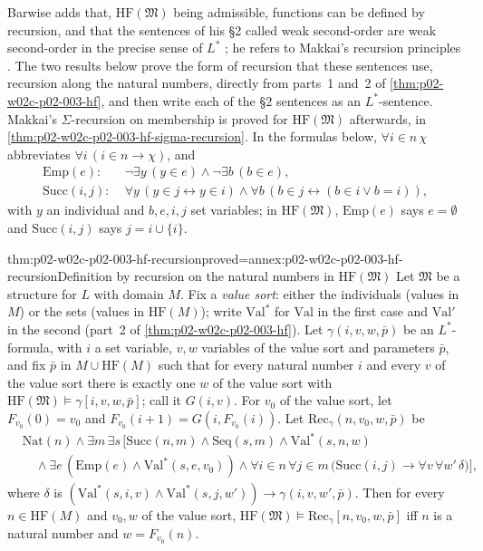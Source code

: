 Barwise adds that, \(\mathrm{HF}(\mathfrak M)\) being admissible, functions
can be defined by recursion, and that the sentences of his \S2 called weak
second-order are weak second-order in the precise sense of \(L^{*}\)
\cite[ch.~A.1, \S5, 5.3, p.~43]{Barwise1977FirstOrder}; he refers to
Makkai's recursion principles \cite[ch.~A.7, \S2, 2.16--2.17, p.~243]{Makkai1977}.
The two results below prove the form of recursion that these sentences
use, recursion along the natural numbers, directly from parts~1 and~2 of
\cref{thm:p02-w02c-p02-003-hf}, and then write each of the \S2 sentences
as an \(L^{*}\)-sentence.  Makkai's \(\Sigma\)-recursion on membership is
proved for \(\mathrm{HF}(\mathfrak M)\) afterwards, in
\cref{thm:p02-w02c-p02-003-hf-sigma-recursion}.
In the formulas below, \(\forall i\in n\,\chi\) abbreviates
\(\forall i\,(i\in n\to\chi)\), and
\begin{align*}
 \mathrm{Emp}(e)\colon\;&\neg\exists y\,(y\in e)\land\neg\exists b\,(b\in e),\\
 \mathrm{Succ}(i,j)\colon\;&\forall y\,(y\in j\leftrightarrow y\in i)\land
   \forall b\,(b\in j\leftrightarrow(b\in i\lor b=i)),
\end{align*}
with \(y\) an individual and \(b,e,i,j\) set variables; in
\(\mathrm{HF}(\mathfrak M)\), \(\mathrm{Emp}(e)\) says \(e=\emptyset\) and
\(\mathrm{Succ}(i,j)\) says \(j=i\cup\{i\}\).

\begin{hbtheorem}{thm:p02-w02c-p02-003-hf-recursion}{proved=annex:p02-w02c-p02-003-hf-recursion}{Definition by recursion on the natural numbers in \(\mathrm{HF}(\mathfrak M)\)}
Let \(\mathfrak M\) be a structure for \(L\) with domain \(M\).  Fix a
\emph{value sort}: either the individuals (values in \(M\)) or the sets
(values in \(\mathrm{HF}(M)\)); write \(\mathrm{Val}^{\ast}\) for
\(\mathrm{Val}\) in the first case and \(\mathrm{Val}'\) in the second
(part~2 of \cref{thm:p02-w02c-p02-003-hf}).  Let
\(\gamma(i,v,w,\bar p)\) be an \(L^{*}\)-formula, with \(i\) a set
variable, \(v,w\) variables of the value sort and parameters \(\bar p\),
and fix \(\bar p\) in \(M\cup\mathrm{HF}(M)\) such that for every natural
number \(i\) and every \(v\) of the value sort there is exactly one \(w\)
of the value sort with \(\mathrm{HF}(\mathfrak M)\models\gamma[i,v,w,\bar
p]\); call it \(G(i,v)\).  For \(v_0\) of the value sort, let
\(F_{v_0}(0)=v_0\) and \(F_{v_0}(i+1)=G(i,F_{v_0}(i))\).  Let
\(\mathrm{Rec}_\gamma(n,v_0,w,\bar p)\) be
\[
\begin{aligned}
&\mathrm{Nat}(n)\land\exists m\,\exists s\,\bigl[\mathrm{Succ}(n,m)\land
 \mathrm{Seq}(s,m)\land\mathrm{Val}^{\ast}(s,n,w)\\
&\quad{}\land\exists e\,(\mathrm{Emp}(e)\land\mathrm{Val}^{\ast}(s,e,v_0))
 \land\forall i\in n\,\forall j\in m\,\bigl(\mathrm{Succ}(i,j)\to
 \forall v\,\forall w'\,\delta\bigr)\bigr],
\end{aligned}
\]
where \(\delta\) is \((\mathrm{Val}^{\ast}(s,i,v)\land
\mathrm{Val}^{\ast}(s,j,w'))\to\gamma(i,v,w',\bar p)\).
Then for every \(n\in\mathrm{HF}(M)\) and \(v_0,w\) of the value sort,
\(\mathrm{HF}(\mathfrak M)\models\mathrm{Rec}_\gamma[n,v_0,w,\bar p]\) iff
\(n\) is a natural number and \(w=F_{v_0}(n)\).
\end{hbtheorem}

